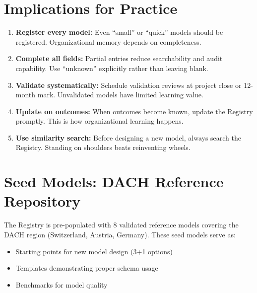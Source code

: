\section{Implications for Practice}
\label{sec:fff-practice}

\begin{tcolorbox}[colback=green!5!white, colframe=green!75!black,
    title=Practical Implications]
\begin{enumerate}
\item \textbf{Register every model:} Even ``small'' or ``quick'' models should
    be registered. Organizational memory depends on completeness.
\item \textbf{Complete all fields:} Partial entries reduce searchability and
    audit capability. Use ``unknown'' explicitly rather than leaving blank.
\item \textbf{Validate systematically:} Schedule validation reviews at project
    close or 12-month mark. Unvalidated models have limited learning value.
\item \textbf{Update on outcomes:} When outcomes become known, update the
    Registry promptly. This is how organizational learning happens.
\item \textbf{Use similarity search:} Before designing a new model, always
    search the Registry. Standing on shoulders beats reinventing wheels.
\end{enumerate}
\end{tcolorbox}


\section{Seed Models: DACH Reference Repository}
\label{sec:fff-seed}

The Registry is pre-populated with 8 validated reference models covering the
DACH region (Switzerland, Austria, Germany). These seed models serve as:
\begin{itemize}[nosep]
\item Starting points for new model design (3+1 options)
\item Templates demonstrating proper schema usage
\item Benchmarks for model quality
\end{itemize}

